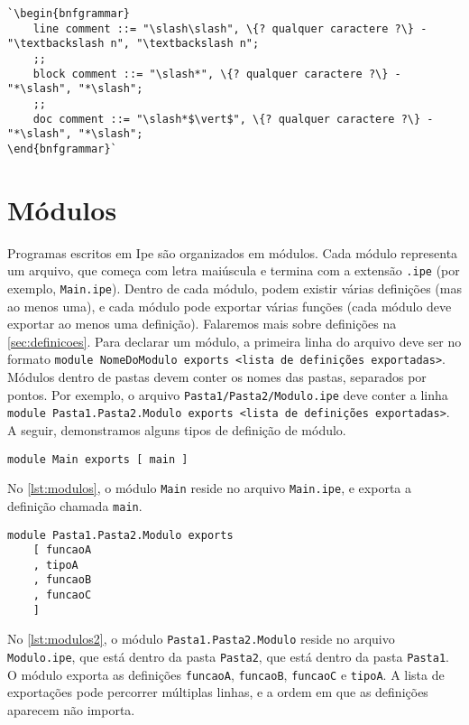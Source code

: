 \begin{lstlisting}[label={grammar:comentarios},caption={Definição de comentários em EBNF},escapechar=`,numbers=none]
`\begin{bnfgrammar}
    line comment ::= "\slash\slash", \{? qualquer caractere ?\} - "\textbackslash n", "\textbackslash n";
    ;;
    block comment ::= "\slash*", \{? qualquer caractere ?\} - "*\slash", "*\slash";
    ;;
    doc comment ::= "\slash*$\vert$", \{? qualquer caractere ?\} - "*\slash", "*\slash";
\end{bnfgrammar}`
\end{lstlisting}


\section{Módulos}

Programas escritos em Ipe são organizados em módulos. Cada módulo representa um
arquivo, que começa com letra maiúscula e termina com a extensão \texttt{.ipe}
(por exemplo, \texttt{Main.ipe}). Dentro de cada módulo, podem existir várias
definições (mas ao menos uma), e cada módulo pode exportar várias funções (cada módulo
deve exportar ao menos uma definição). Falaremos mais sobre definições na
\autoref{sec:definicoes}. Para declarar um módulo, a primeira linha do arquivo deve
ser no formato \texttt{module NomeDoModulo exports <lista de definições exportadas>}.
Módulos dentro de pastas devem conter os nomes das pastas, separados por pontos.
Por exemplo, o arquivo \texttt{Pasta1/Pasta2/Modulo.ipe} deve conter a linha
\texttt{module Pasta1.Pasta2.Modulo exports <lista de definições exportadas>}.
A seguir, demonstramos alguns tipos de definição de módulo.

\begin{lstlisting}[label={lst:modulos},caption={Exemplo de módulos}]
module Main exports [ main ]
\end{lstlisting}

No \autoref{lst:modulos}, o módulo \texttt{Main} reside no arquivo \texttt{Main.ipe},
e exporta a definição chamada \texttt{main}.

\begin{lstlisting}[label={lst:modulos2},caption={Exemplo de módulo em subpasta que exporta várias definições}]
module Pasta1.Pasta2.Modulo exports
    [ funcaoA
    , tipoA
    , funcaoB
    , funcaoC
    ]
\end{lstlisting}

No \autoref{lst:modulos2}, o módulo \texttt{Pasta1.Pasta2.Modulo} reside no arquivo
\texttt{Modulo.ipe}, que está dentro da pasta \texttt{Pasta2}, que está dentro da
pasta \texttt{Pasta1}. O módulo exporta as definições \texttt{funcaoA}, \texttt{funcaoB},
\texttt{funcaoC} e \texttt{tipoA}. A lista de exportações pode percorrer múltiplas
linhas, e a ordem em que as definições aparecem não importa.

